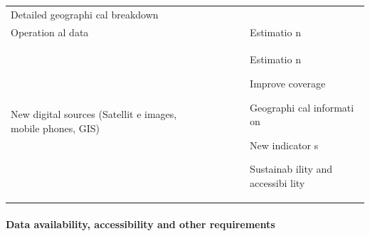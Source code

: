 \documentclass[
]{article}
\begin{document}
\begin{longtable}[]{@{}llllll@{}}
\begin{minipage}[t]{0.14\columnwidth}
Detailed
geographi
cal
breakdown\strut
\end{minipage}\tabularnewline
\begin{minipage}[t]{0.14\columnwidth}\raggedright
Operation
al
data\strut
\end{minipage} & \begin{minipage}[t]{0.14\columnwidth}\raggedright
\strut
\end{minipage} & \begin{minipage}[t]{0.14\columnwidth}\raggedright
\strut
\end{minipage} & \begin{minipage}[t]{0.14\columnwidth}\raggedright
\strut
\end{minipage} & \begin{minipage}[t]{0.14\columnwidth}\raggedright
\strut
\end{minipage} & \begin{minipage}[t]{0.14\columnwidth}\raggedright
Estimatio
n\strut
\end{minipage}\tabularnewline
\begin{minipage}[t]{0.14\columnwidth}\raggedright
New
digital
sources
(Satellit
e
images,
mobile
phones,
GIS)\strut
\end{minipage} & \begin{minipage}[t]{0.14\columnwidth}\raggedright
\strut
\end{minipage} & \begin{minipage}[t]{0.14\columnwidth}\raggedright
\strut
\end{minipage} & \begin{minipage}[t]{0.14\columnwidth}\raggedright
\strut
\end{minipage} & \begin{minipage}[t]{0.14\columnwidth}\raggedright
\strut
\end{minipage} & \begin{minipage}[t]{0.14\columnwidth}\raggedright
Estimatio
n

Improve
coverage

Geographi
cal
informati
on

New
indicator
s

Sustainab
ility
and
accessibi
lity\strut
\end{minipage}\tabularnewline
\bottomrule
\end{longtable}

\hypertarget{d.2.-data-availability-accessibility-and-other-requirements}{%
\paragraph{Data availability, accessibility and other requirements}\label{d.2.-data-availability-accessibility-and-other-requirements}}
\end{document}
